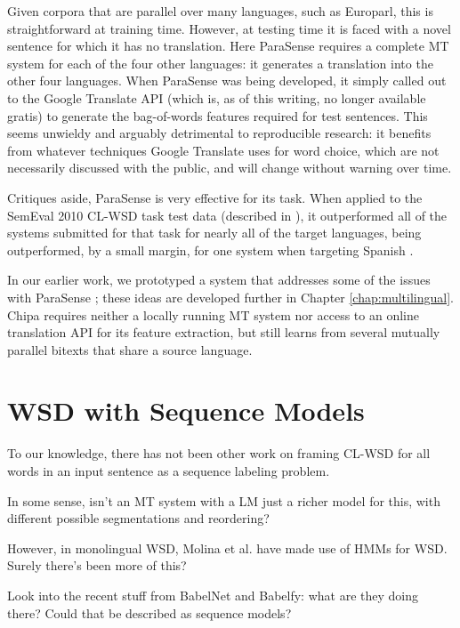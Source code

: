 Given corpora that are parallel over many languages, such as Europarl, this is
straightforward at training time. However, at testing time it is faced with a
novel sentence for which it has no translation. Here ParaSense requires a
complete MT system for each of the four other languages: it generates a
translation into the other four languages.
When ParaSense was being developed, it simply called out to the Google
Translate API (which is, as of this writing, no longer available gratis) to
generate the bag-of-words features required for test sentences.
This seems unwieldy and arguably detrimental to reproducible research: it
benefits from whatever techniques Google Translate uses for word choice,
which are not necessarily discussed with the public, and will change
without warning over time.

Critiques aside, ParaSense is very effective for its task.  When applied to the
SemEval 2010 CL-WSD task test data (described in
\cite{lefever-hoste:2010:SemEval}), it outperformed all of the systems
submitted for that task for nearly all of the target languages, being
outperformed, by a small margin, for one system when targeting Spanish
\cite{lefever-hoste-decock:2011:ACL-HLT2011}.

In our earlier work, we prototyped a system that addresses some of the issues
with ParaSense \cite{rudnick-liu-gasser:2013:SemEval-2013}; these ideas are
developed further in Chapter \ref{chap:multilingual}.
Chipa requires neither a locally running MT system nor access to an online
translation API for its feature extraction, but still learns from several
mutually parallel bitexts that share a source language.


\section{WSD with Sequence Models}
To our knowledge, there has not been other work on framing CL-WSD for all words
in an input sentence as a sequence labeling problem.

In some sense, isn't an MT system with a LM just a richer model for
this, with different possible segmentations and reordering?

However, in monolingual WSD, Molina et al.
\cite{DBLP:conf/iberamia/MolinaPS02} have made use of HMMs for WSD. Surely
there's been more of this?

Look into the recent stuff from BabelNet and Babelfy: what are they doing
there? Could that be described as sequence models?


